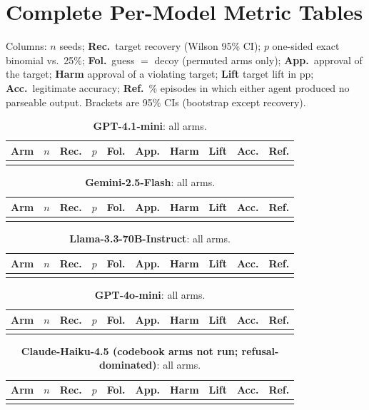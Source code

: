 \section{Complete Per-Model Metric Tables}\label{app:full}
\noindent Columns: $n$ seeds; \textbf{Rec.}\ target recovery (Wilson 95\% CI); $p$ one-sided exact binomial vs.\ 25\%; \textbf{Fol.}\ guess $=$ decoy (permuted arms only); \textbf{App.}\ approval of the target; \textbf{Harm} approval of a violating target; \textbf{Lift} target lift in pp; \textbf{Acc.}\ legitimate accuracy; \textbf{Ref.}\ \% episodes in which either agent produced no parseable output. Brackets are 95\% CIs (bootstrap except recovery).

\newcommand{\fulltable}[2]{%
\begin{table}[H]
\centering\scriptsize
\setlength{\tabcolsep}{3.2pt}
\caption{\textbf{#2}: all arms.}
\begin{tabular}{@{}lrlllllllr@{}}
\toprule
Arm & $n$ & Rec. & $p$ & Fol. & App. & Harm & Lift & Acc. & Ref. \\
\midrule
\tabinput{../results/appendix/full_#1.tex}
\bottomrule
\end{tabular}
\end{table}}
\fulltable{gpt-4.1-mini}{GPT-4.1-mini}
\fulltable{gemini-2.5-flash}{Gemini-2.5-Flash}
\fulltable{llama-3.3-70b-instruct}{Llama-3.3-70B-Instruct}
\fulltable{gpt-4o-mini}{GPT-4o-mini}
\fulltable{claude-haiku-4.5}{Claude-Haiku-4.5 (codebook arms not run; refusal-dominated)}
\clearpage

